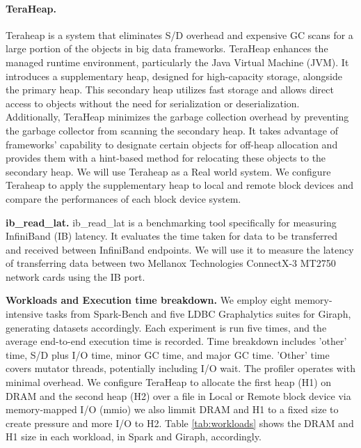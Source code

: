 \paragraph{TeraHeap.} Teraheap is a system that eliminates S/D overhead and expensive GC scans for a
large portion of the objects in big data frameworks. TeraHeap enhances the
managed runtime environment, particularly the Java Virtual Machine (JVM). It
introduces a supplementary heap, designed for high-capacity storage, alongside
the primary heap. This secondary heap utilizes fast storage and allows direct
access to objects without the need for serialization or deserialization.
Additionally, TeraHeap minimizes the garbage collection overhead by preventing
the garbage collector from scanning the secondary heap. It takes advantage of
frameworks' capability to designate certain objects for off-heap allocation and
provides them with a hint-based method for relocating these objects to the
secondary heap. We will use Teraheap as a Real world system. We configure Teraheap to apply the supplementary heap to local and remote block devices and compare the performances of each block device system.
\par\textbf{ib\_read\_lat.} ib\_read\_lat is a benchmarking tool specifically for measuring InfiniBand (IB) latency. It evaluates the time taken for data to be transferred and received between InfiniBand endpoints. We will use it to measure the latency of transferring data between two Mellanox Technologies ConnectX-3 MT2750 network cards using the IB port.
\par\textbf{Workloads and Execution time breakdown.} We employ eight memory-intensive tasks from Spark-Bench and five LDBC Graphalytics suites for Giraph, generating datasets accordingly. Each experiment is run five times, and the average end-to-end execution time is recorded. Time breakdown includes 'other' time, S/D plus I/O time, minor GC time, and major GC time. 'Other' time covers mutator threads, potentially including I/O wait. The profiler operates with minimal overhead. We configure TeraHeap to allocate the first heap (H1) on DRAM and the second heap (H2) over a file in Local or Remote block device via memory-mapped I/O (mmio) we also limmit DRAM and H1 to a fixed size to create pressure and more I/O to H2. Table \ref{tab:workloads} shows the DRAM and H1 size in each workload, in Spark and Giraph, accordingly.
